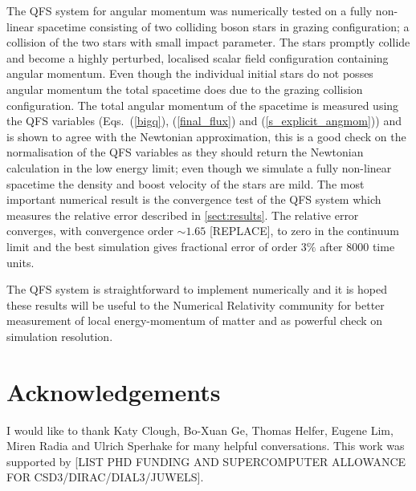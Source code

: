The QFS system for angular momentum was numerically tested on a fully non-linear spacetime consisting of two colliding boson stars in grazing configuration; a collision of the two stars with small impact parameter. The stars promptly collide and become a highly perturbed, localised scalar field configuration containing angular momentum. Even though the individual initial stars do not posses angular momentum the total spacetime does due to the grazing collision configuration. The total angular momentum of the spacetime is measured using the QFS variables (Eqs.~(\ref{bigq}), (\ref{final_flux}) and (\ref{s_explicit_angmom})) and is shown to agree with the Newtonian approximation, this is a good check on the normalisation of the QFS variables as they should return the Newtonian calculation in the low energy limit; even though we simulate a fully non-linear spacetime the density and boost velocity of the stars are mild. The most important numerical result is the convergence test of the QFS system which measures the relative error described in \ref{sect:results}. The relative error converges, with convergence order $\sim 1.65$ [REPLACE], to zero in the continuum limit and the best simulation gives fractional error of order $3 \%$ after $8000$ time units. 

The QFS system is straightforward to implement numerically and it is hoped these results will be useful to the Numerical Relativity community for better measurement of local energy-momentum of matter and as powerful check on simulation resolution.


\section*{Acknowledgements} \label{sect:thanks}
I would like to thank Katy Clough, Bo-Xuan Ge, Thomas Helfer, Eugene Lim, Miren Radia and Ulrich Sperhake for many helpful conversations.
This work was supported by [LIST PHD FUNDING AND SUPERCOMPUTER ALLOWANCE FOR CSD3/DIRAC/DIAL3/JUWELS].



\appendix












